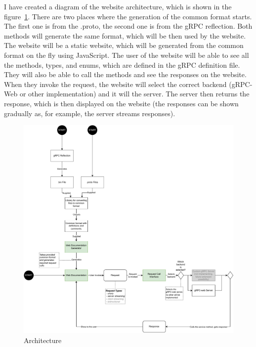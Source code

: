 I have created a diagram of the website architecture, which is shown in the figure~\ref{fig:grpcflair-architecture}.
There are two places where the generation of the common format starts.
The first one is from the .proto, the second one is from the gRPC reflection.
Both methods will generate the same format, which will be then used by the website.
The website will be a static website, which will be generated from the common format on the fly using JavaScript.
The user of the website will be able to see all the methods, types, and enums, which are defined in the gRPC definition file.
They will also be able to call the methods and see the responses on the website.
When they invoke the request, the website will select the correct backend (gRPC-Web or other implementation) and it will the server.
The server then returns the response, which is then displayed on the website (the responses can be shown gradually as, for example, the server streams responses).


\begin{figure}[hbt!]
    \centering
    \captionsetup{justification=centering}
    \includegraphics[width=1.0\textwidth]{images/design/grpcdoc-architecture}
    \caption{Architecture}
    \label{fig:grpcflair-architecture}
\end{figure}

